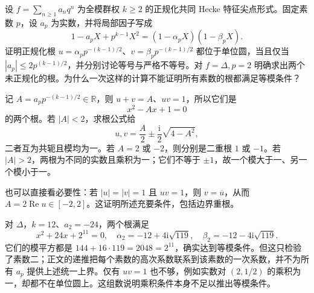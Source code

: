 \begin{exercise}\label{b3:ex:E-3}
设 \(f=\sum_{n\ge1}a_nq^n\) 为全模群权 \(k\ge2\) 的正规化共同 Hecke 特征尖点形式。固定素数 \(p\)，设 \(a_p\) 为实数，并将局部因子写成
\[
 1-a_pX+p^{k-1}X^2=(1-\alpha_pX)(1-\beta_pX).
\]
证明正规化根 \(u=\alpha_pp^{-(k-1)/2}\)、\(v=\beta_pp^{-(k-1)/2}\) 都位于单位圆，当且仅当 \(|a_p|\le2p^{(k-1)/2}\)，并分别讨论等号与严格不等号。对 \(f=\Delta,p=2\) 明确求出两个未正规化的根。为什么一次这样的计算不能证明所有素数的根都满足等模条件？
\end{exercise}
\begin{solution}
记 \(A=a_pp^{-(k-1)/2}\in\mathbb R\)，则 \(u+v=A\)、\(uv=1\)，所以它们是
\[
 x^2-Ax+1=0
\]
的两个根。若 \(|A|<2\)，求根公式给
\[
 u,v=\frac A2\pm\frac{\mathrm{i}}2\sqrt{4-A^2},
\]
二者互为共轭且模均为一。若 \(A=2\) 或 \(-2\)，则分别是二重根 \(1\) 或 \(-1\)。若 \(|A|>2\)，两根为不同的实数且乘积为一；它们不等于 \(\pm1\)，故一个模大于一、另一个模小于一。

也可以直接看必要性：若 \(|u|=|v|=1\) 且 \(uv=1\)，则 \(v=\overline u\)，从而 \(A=2\operatorname{Re}u\in[-2,2]\)。这证明所述充要条件，包括边界重根。

对 \(\Delta\)，\(k=12\)、\(a_2=-24\)，两个根满足
\[
 x^2+24x+2^{11}=0,
 \quad \alpha_2=-12+4\mathrm{i}\sqrt{119},
 \quad \beta_2=-12-4\mathrm{i}\sqrt{119}.
\]
它们的模平方都是 \(144+16\cdot119=2048=2^{11}\)，确实达到等模条件。但这只检验了素数二；正文的递推把每个素数的高次系数联系到该素数的一次系数，并不为所有 \(a_p\) 提供上述统一上界。仅有 \(uv=1\) 也不够，例如实数对 \((2,1/2)\) 的乘积为一，却都不在单位圆上。这组数说明乘积条件本身不足以推出等模条件。
\end{solution}

